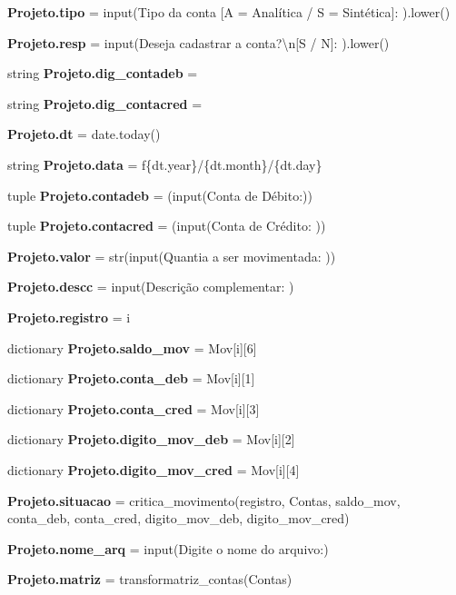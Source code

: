\begin{DoxyCompactItemize}
\item 
\textbf{ Projeto.\+tipo} = input(\textquotesingle{}Tipo da conta [A = Analítica / S = Sintética]\+: \textquotesingle{}).lower()
\item 
\textbf{ Projeto.\+resp} = input(\textquotesingle{}Deseja cadastrar a conta?\textbackslash{}n[S / N]\+: \textquotesingle{}).lower()
\item 
string \textbf{ Projeto.\+dig\+\_\+contadeb} = \textquotesingle{}\textquotesingle{}
\item 
string \textbf{ Projeto.\+dig\+\_\+contacred} = \textquotesingle{}\textquotesingle{}
\item 
\textbf{ Projeto.\+dt} = date.\+today()
\item 
string \textbf{ Projeto.\+data} = f\textquotesingle{}\{dt.\+year\}/\{dt.\+month\}/\{dt.\+day\}\textquotesingle{}
\item 
tuple \textbf{ Projeto.\+contadeb} = (input(\textquotesingle{}Conta de Débito\+:\textquotesingle{}))
\item 
tuple \textbf{ Projeto.\+contacred} = (input(\textquotesingle{}Conta de Crédito\+: \textquotesingle{}))
\item 
\textbf{ Projeto.\+valor} = str(input(\textquotesingle{}Quantia a ser movimentada\+: \textquotesingle{}))
\item 
\textbf{ Projeto.\+descc} = input(\textquotesingle{}Descrição complementar\+: \textquotesingle{})
\item 
\textbf{ Projeto.\+registro} = i
\item 
dictionary \textbf{ Projeto.\+saldo\+\_\+mov} = Mov[i][6]
\item 
dictionary \textbf{ Projeto.\+conta\+\_\+deb} = Mov[i][1]
\item 
dictionary \textbf{ Projeto.\+conta\+\_\+cred} = Mov[i][3]
\item 
dictionary \textbf{ Projeto.\+digito\+\_\+mov\+\_\+deb} = Mov[i][2]
\item 
dictionary \textbf{ Projeto.\+digito\+\_\+mov\+\_\+cred} = Mov[i][4]
\item 
\textbf{ Projeto.\+situacao} = critica\+\_\+movimento(registro, Contas, saldo\+\_\+mov, conta\+\_\+deb, conta\+\_\+cred, digito\+\_\+mov\+\_\+deb, digito\+\_\+mov\+\_\+cred)
\item 
\textbf{ Projeto.\+nome\+\_\+arq} = input(\textquotesingle{}Digite o nome do arquivo\+:\textquotesingle{})
\item 
\textbf{ Projeto.\+matriz} = transformatriz\+\_\+contas(Contas)
\item 

\end{DoxyCompactItemize}
